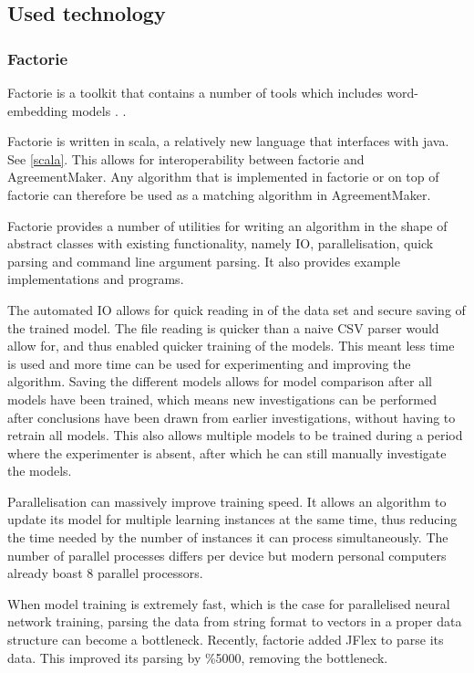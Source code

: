 \documentclass{article}
\begin{document}
 \subsection{Used technology}
 \subsubsection{Factorie} \label{factorie} %
 Factorie is a toolkit that contains a number of tools which includes word-embedding models \cite{git-factorie}. \cite{w2v}.
 
 Factorie is written in scala, a relatively new language that interfaces with java. See \ref{scala}. This allows for interoperability between factorie and AgreementMaker. Any algorithm that is implemented in factorie or on top of factorie can therefore be used as a matching algorithm in AgreementMaker.
 
 Factorie provides a number of utilities for writing an algorithm in the shape of abstract classes with existing functionality, namely IO, parallelisation, quick parsing and command line argument parsing. It also provides example implementations and programs.
 
 The automated IO allows for quick reading in of the data set and secure saving of the trained model. The file reading is quicker than a naive CSV parser would allow for, and thus enabled quicker training of the models. This meant less time is used and more time can be used for experimenting and improving the algorithm. Saving the different models allows for model comparison after all models have been trained, which means new investigations can be performed after conclusions have been drawn from earlier investigations, without having to retrain all models. This also allows multiple models to be trained during a period where the experimenter is absent, after which he can still manually investigate the models.
 
 Parallelisation can massively improve training speed. It allows an algorithm to update its model for multiple learning instances at the same time, thus reducing the time needed by the number of instances it can process simultaneously. The number of parallel processes differs per device but modern personal computers already boast 8 parallel processors.
 
 When model training is extremely fast, which is the case for parallelised neural network training, parsing the data from string format to vectors in a proper data structure can become a bottleneck. Recently, factorie added JFlex to parse its data. This improved its parsing by \%5000, removing the bottleneck.
 
\end{document}
